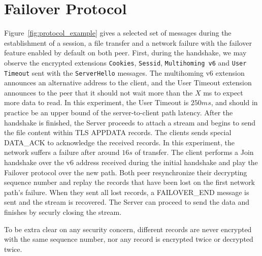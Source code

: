 \section{Failover Protocol}

Figure~\ref{fig:protocol_example} gives a selected set of messages during the
establishment of a \tcpls session, a file transfer and a network failure with
the failover feature enabled by default on both peer. First, during the \tcpls
handshake, we may observe the \tls encrypted extensions \texttt{Cookies}, \texttt{Sessid},
\texttt{Multihoming v6} and \texttt{User Timeout} sent with the
\texttt{ServerHello} messages. The multihoming v6 extension announces an
alternative address to the client, and the User Timeout \tcpls extension
announces to the peer that it should not wait more than the $X$ ms to expect
more data to read. In this experiment, the User Timeout is $250ms$, and
should in practice be an upper bound of the server-to-client path latency.
After the handshake is finished, the Server proceeds to attach a stream and
begins to send the file content within TLS APPDATA records. The clients sends
special \tcpls DATA\_ACK to acknowledge the received records. In this
experiment, the network suffers a failure after around $16s$ of transfer. The client performs a
Join \tcpls handshake over the v6 address received during the \tcpls initial
handshake and play the Failover protocol over the new path. Both peer
resynchronize their decrypting sequence number and replay the records that have
been lost on the first network path's failure. When they sent all lost records,
a FAILOVER\_END message is sent and the stream is recovered. The Server can
proceed to send the data and finishes by securly closing the stream.

To be extra clear on any security concern, different records are never encrypted
with the same sequence number, nor any record is encrypted twice or decrypted
twice.

\def\Client{Client}
\def\Server{Server}
\def\Inactivity{Inactivity}
\def\Event{Event}


